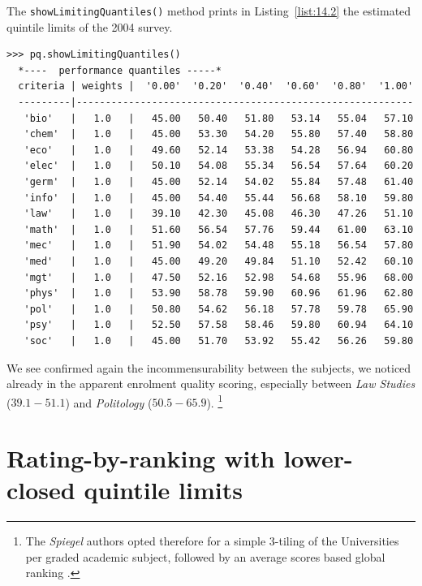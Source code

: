 The \texttt{showLimitingQuantiles()} method prints in Listing~\vref{list:14.2} the estimated quintile limits of the 2004 survey.
\begin{lstlisting}[caption={Estimated quintile limits of the 2004 survey},label=list:14.2,basicstyle=\ttfamily\scriptsize]
>>> pq.showLimitingQuantiles()
  *----  performance quantiles -----*
  criteria | weights |  '0.00'  '0.20'  '0.40'  '0.60'  '0.80'  '1.00'   
  ---------|----------------------------------------------------------
   'bio'   |   1.0   |   45.00   50.40   51.80   53.14   55.04   57.10  
   'chem'  |   1.0   |   45.00   53.30   54.20   55.80   57.40   58.80  
   'eco'   |   1.0   |   49.60   52.14   53.38   54.28   56.94   60.80  
   'elec'  |   1.0   |   50.10   54.08   55.34   56.54   57.64   60.20  
   'germ'  |   1.0   |   45.00   52.14   54.02   55.84   57.48   61.40  
   'info'  |   1.0   |   45.00   54.40   55.44   56.68   58.10   59.80  
   'law'   |   1.0   |   39.10   42.30   45.08   46.30   47.26   51.10  
   'math'  |   1.0   |   51.60   56.54   57.76   59.44   61.00   63.10  
   'mec'   |   1.0   |   51.90   54.02   54.48   55.18   56.54   57.80  
   'med'   |   1.0   |   45.00   49.20   49.84   51.10   52.42   60.10  
   'mgt'   |   1.0   |   47.50   52.16   52.98   54.68   55.96   68.00  
   'phys'  |   1.0   |   53.90   58.78   59.90   60.96   61.96   62.80  
   'pol'   |   1.0   |   50.80   54.62   56.18   57.78   59.78   65.90  
   'psy'   |   1.0   |   52.50   57.58   58.46   59.80   60.94   64.10  
   'soc'   |   1.0   |   45.00   51.70   53.92   55.42   56.26   59.80  
\end{lstlisting}
                     
We see confirmed again the incommensurability between the subjects, we noticed already in the apparent enrolment quality scoring, especially between \emph{Law Studies} ($39.1 - 51.1$) and \emph{Politology} ($50.5 - 65.9$). \footnote{The \emph{Spiegel} authors opted therefore for a simple 3-tiling of the Universities per graded academic subject, followed by an average \Borda scores based global ranking \citep{SPI-2004}.}


\section{Rating-by-ranking with lower-closed quintile limits}
\label{sec:14.3}


